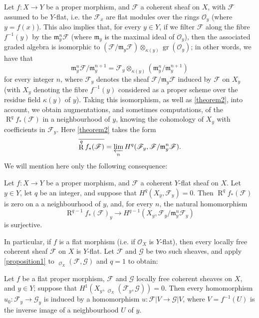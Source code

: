 \documentclass{article}
\theoremstyle{plain}
\newenvironment{theorem}[1]
  {\renewcommand\theinnercustomtheorem{#1}\innercustomtheorem}
  {\endinnercustomtheorem}
\newenvironment{proposition}[1]
  {\renewcommand\theinnercustomproposition{#1}\innercustomproposition}
  {\endinnercustomproposition}
\theoremstyle{definition}
\newcommand{\sh}[1]{{\mathscr{#1}}}
\newcommand{\fk}{\mathfrak}
\newcommand{\kres}{\kappa}
\DeclareMathOperator{\RR}{R}
\DeclareMathOperator{\Hom}{Hom}
\DeclareMathOperator{\shHom}{\underline{\Hom}}
\DeclareMathOperator{\gr}{gr}
\newcommand{\oldpage}[1]{\marginpar{\footnotesize$\Big\vert$ \textit{p.~#1}}}
\begin{document}
Let $f\colon X\to Y$ be a proper morphism, and $\sh{F}$ a coherent sheaf on $X$,
\oldpage{182-09}
with $\sh{F}$ assumed to be $Y$-flat, i.e. the $\sh{F}_x$ are flat modules over the rings $\sh{O}_y$ (where $y=f(x)$).
This also implies that, for every $y\in Y$, if we filter $\sh{F}$ along the fibre $f^{-1}(y)$ by the $\fk{m}_y^n\sh{F}$ (where $\fk{m}_y$ is the maximal ideal of $\sh{O}_y$), then the associated graded algebra is isomorphic to $(\sh{F}/\fk{m}_y\sh{F})\otimes_{\kres(y)}\gr(\sh{O}_y)$;
in other words, we have that
\[
  \fk{m}_y^n\sh{F}/\fk{m}_y^{n+1}
  = \sh{F}_y\otimes_{\kres(y)}(\fk{m}_y^n/\fk{m}_y^{n+1})
\]
for every integer $n$, where $\sh{F}_y$ denotes the sheaf $\sh{F}/\fk{m}_y\sh{F}$ induced by $\sh{F}$ on $X_y$ (with $X_y$ denoting the fibre $f^{-1}(y)$ considered as a proper scheme over the residue field $\kres(y)$ of $y$).
Taking this isomorphism, as well as \cref{theorem2}, into account, we obtain augmentations, and sometimes computations, of the $\RR^q f_*(\sh{F})$ in a neighbourhood of $y$, knowing the cohomology of $X_y$ with coefficients in $\sh{F}_y$.
Here \cref{theorem2} takes the form
\[
  \overline{\RR^q f_*(\sh{F})} = \varprojlim_n H^q(\sh{F}_y,\sh{F}/\fk{m}_y^n\sh{F}).
\]
We will mention here only the following consequence:

\begin{proposition}{1}
\label{proposition1}
  Let $f\colon X\to Y$ be a proper morphism, and $\sh{F}$ a coherent $Y$-flat sheaf on $X$.
  Let $y\in Y$, let $q$ be an integer, and suppose that $H^q(X_y,\sh{F}_y)=0$.
  Then $\RR^q f_*(\sh{F})$ is zero on a a neighbourhood of $y$, and, for every $n$, the natural homomorphism
  \[
    \RR^{q-1}f_*(\sh{F})_y \to H^{q-1}(X_y,\sh{F}_y/\fk{m}_y^n\sh{F}_y)
  \]
  is surjective.
\end{proposition}

In particular, if $f$ is a flat morphism (i.e. if $\sh{O}_X$ is $Y$-flat), then every locally free coherent sheaf $\sh{F}$ on $X$ is $Y$-flat.
Let $\sh{F}$ and $\sh{G}$ be two such sheaves, and apply \cref{proposition1} to $\shHom_{\sh{O}_X}(\sh{F},\sh{G})$ and $q=1$ to obtain:

\begin{theorem}{7}
\label{theorem7}
  Let $f$ be a flat proper morphism, $\sh{F}$ and $\sh{G}$ locally free coherent sheaves on $X$, and $y\in Y$;
  suppose that $H^1(X_y,\shHom_{\sh{O}_X}(\sh{F}_y,\sh{G}))=0$.
  Then every homomorphism $u_0\colon\sh{F}_y\to\sh{G}_y$ is induced by a homomorphism $u\colon\sh{F}|V\to\sh{G}|V$, where $V=f^{-1}(U)$ is the inverse image of a neighbourhood $U$ of $y$.
\end{theorem}
\end{document}
